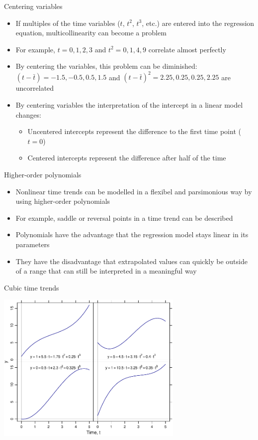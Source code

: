 \documentclass[aspectratio=169]{beamer}
\begin{document}
\begin{frame}{Centering variables}
  \begin{itemize}
    \item If multiples of the time variables ($t$, $t^2$, $t^3$, etc.) are
      entered into the regression equation, multicollinearity can become a
      problem
    \item For example, $t = 0, 1, 2, 3$ and $t^2 = 0, 1, 4, 9$ correlate almost
      perfectly
    \item By centering the variables, this problem can be diminished: $(t -
      \bar{t}) = -1.5, -0.5, 0.5,  1.5$ and $(t - \bar{t})^2 = 2.25, 0.25, 0.25,
      2.25$ are uncorrelated
    \item By centering variables the interpretation of the intercept in a linear
      model changes:
  \begin{itemize}
    \item Uncentered intercepts represent the difference to the first time 
    point ($t = 0$)
    \item Centered intercepts represent the difference after half of the 
    time
  \end{itemize}
  \end{itemize}
\end{frame}

\begin{frame}{Higher-order polynomials}
  \begin{itemize}
    \item Nonlinear time trends can be modelled in a flexibel and parsimonious
      way by using higher-order polynomials
    \item For example, saddle or reversal points in a time trend can be
      described
    \item Polynomials have the advantage that the regression model stays linear
      in its parameters
    \item They have the disadvantage that extrapolated values can quickly be
      outside of a range that can still be interpreted in a meaningful way
  \end{itemize}
\end{frame}


\begin{frame}{Cubic time trends}
\begin{center}
\includegraphics[width=9cm]{../figures/cubic}
\end{center}
\end{frame}
\end{document}
